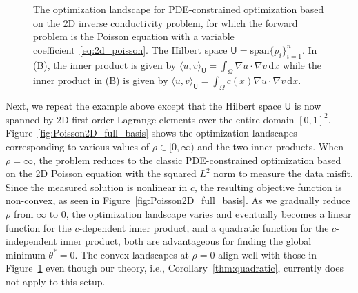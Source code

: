 \documentclass[12pt]{amsart}
\begin{document}
\begin{figure}[ht!]
    \centering
    \caption{The optimization landscape for PDE-constrained optimization based on the 2D inverse conductivity problem, for which the forward problem is the Poisson equation with a variable coefficient~\eqref{eq:2d_poisson}. The Hilbert space $\mathsf{U} = \text{span}\{p_i\}_{i=1}^n$. In (B), the inner product is given by $\langle u, v\rangle_{\mathsf{U}} = \int_\Omega \nabla u \cdot \nabla v  \,  \mathrm{d}x$ while the inner product in (B) is given by  $\langle u, v\rangle_{\mathsf{U}} = \int_\Omega c(x) \nabla u \cdot \nabla v  \,  \mathrm{d}x$.}\label{fig:Poisson2D_source_basis}
\end{figure}

Next, we repeat the example above except that the Hilbert space $\mathsf{U}$ is now  spanned by 2D first-order Lagrange elements over the entire domain $[0,1]^2$. Figure~\ref{fig:Poisson2D_full_basis} shows the optimization landscapes corresponding to various values of $\rho \in [0,\infty)$ and the two inner products. When $\rho =\infty$, the problem reduces to the classic PDE-constrained optimization based on the 2D Poisson equation with the squared $L^2$ norm to measure the data misfit. Since the measured solution is nonlinear in $c$, the resulting objective function is non-convex, as seen in Figure~\ref{fig:Poisson2D_full_basis}. As we gradually reduce $\rho$ from $\infty$ to $0$, the optimization landscape varies and eventually becomes a linear function for the $c$-dependent inner product, and a quadratic function for the $c$-independent inner product, both are advantageous for finding the global minimum $\theta^* = 0$. The  convex landscapes at $\rho = 0$ align well with those in Figure~\ref{fig:Poisson2D_source_basis} even though our theory, i.e., Corollary~\ref{thm:quadratic}, currently does not apply to this setup.
\end{document}
